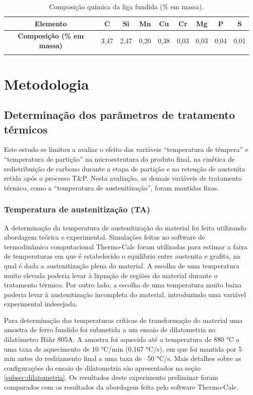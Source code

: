 \begin{table}
	\caption{Composição química da liga fundida (\% em massa).}
	\begin{tabular}{c c c c c c c c c}
	\thickhline
	\textbf{Elemento} & C & Si & Mn & Cu & Cr & Mg & P & S \\
	\hline
	\textbf{Composição (\% em massa)} & 3,47 & 2,47 & 0,20 & 0,38 & 0,03 & 0,03 & 0,04 & 0,01 \\
	\thickhline
	\end{tabular}
	\label{tab:CQ}
\end{table}

\section{Metodologia}

\subsection{Determina\c{c}\~{a}o dos par\^{a}metros de tratamento t\'{e}rmicos}

Este estudo se limitou a avaliar o efeito das variáveis ``temperatura de têmpera'' e ``temperatura de partição'' na microestrutura do produto final, na cinética de redistribuição de carbono durante a etapa de partição e na retenção de austenita retida após o processo T\&P. Nesta avaliação, as demais variáveis de tratamento térmico, como a ``temperatura de austenitização'', foram mantidas fixas.

\subsubsection*{Temperatura de austenitização (TA)} 

A determinação da temperatura de austenitização do material foi feita utilizando abordagem teórica e experimental. Simulações feitas no software de termodinâmica computacional Thermo-Calc\textregistered{} foram utilizadas para estimar a faixa de temperaturas em que é estabelecido o equilíbrio entre austenita e grafita, na qual é dada a austenitização plena do material. A escolha de uma temperatura muito elevada poderia levar à liquação de regiões do material durante o tratamento térmico. Por outro lado, a escolha de uma temperatura muito baixa poderia levar à austenitização incompleta do material, introduzindo uma variável experimental indesejada.

Para determinação das temperaturas críticas de transformação do material uma amostra de ferro fundido foi submetida a um ensaio de dilatometria no dilatômetro Bähr 805A. A amostra foi aquecida até a temperatura de 880 °C a uma taxa de aquecimento de 10 °C/min (0,167 °C/s), em que foi mantida por 5 min antes do resfriamento final a uma taxa de --50 °C/s. Mais detalhes sobre as configurações do ensaio de dilatometria são apresentados na seção \ref{subsec:dilatometria}. Os resultados deste experimento preliminar foram comparados com os resultados da abordagem feita pelo software Thermo-Calc\textregistered{}.

